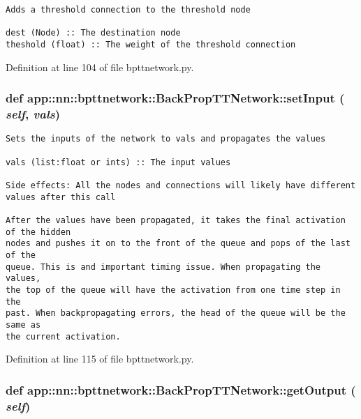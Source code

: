 \footnotesize\begin{verbatim}Adds a threshold connection to the threshold node

dest (Node) :: The destination node
theshold (float) :: The weight of the threshold connection
\end{verbatim}
\normalsize
 

Definition at line 104 of file bpttnetwork.py.
\subsubsection{\setlength{\rightskip}{0pt plus 5cm}def app::nn::bpttnetwork::BackPropTTNetwork::setInput ( {\em self},  {\em vals})}\label{classapp_1_1nn_1_1bpttnetwork_1_1BackPropTTNetwork_9af942d12d5b34c89d863e7c039f80da}




\footnotesize\begin{verbatim}Sets the inputs of the network to vals and propagates the values

vals (list:float or ints) :: The input values

Side effects: All the nodes and connections will likely have different
values after this call

After the values have been propagated, it takes the final activation of the hidden 
nodes and pushes it on to the front of the queue and pops of the last of the
queue. This is and important timing issue. When propagating the values, 
the top of the queue will have the activation from one time step in the
past. When backpropagating errors, the head of the queue will be the same as
the current activation.

\end{verbatim}
\normalsize
 

Definition at line 115 of file bpttnetwork.py.
\subsubsection{\setlength{\rightskip}{0pt plus 5cm}def app::nn::bpttnetwork::BackPropTTNetwork::getOutput ( {\em self})}\label{classapp_1_1nn_1_1bpttnetwork_1_1BackPropTTNetwork_18f4981b4efa1cf74c2e81f4e303782c}




